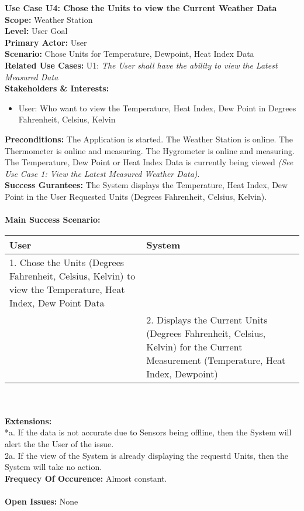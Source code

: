 \documentclass[letterpaper]{article}
\begin{document}
\noindent
\textbf{Use Case U4:  Chose the Units to view the Current Weather
Data}\\
\textbf{Scope:  }Weather Station\\
\textbf{Level:  }User Goal\\
\textbf{Primary Actor:  }User\\
\textbf{Scenario:  }Chose Units for Temperature, Dewpoint, Heat
Index Data\\
\textbf{Related Use Cases:  }U1: \textit{The User shall have the
ability to view the Latest Measured Data}\\
\textbf{Stakeholders \& Interests:  }
\begin{itemize}
\item User:  Who want to view the Temperature, Heat Index, Dew Point
in Degrees Fahrenheit, Celsius, Kelvin
\end{itemize}
\textbf{Preconditions:  }The Application is started. The Weather
Station is online. The Thermometer is online and measuring.
The Hygrometer is online and measuring. The Temperature, Dew Point
or Heat Index Data is currently being viewed
\textit{(See Use Case 1:  View the Latest Measured Weather Data)}.\\
\textbf{Success Gurantees:  }The System displays the Temperature,
Heat Index, Dew Point in the User Requested Units (Degrees
Fahrenheit, Celsius, Kelvin).
\\\\
\textbf{Main Success Scenario:  }\\
\begin{tabular}{|p{6cm}|p{6cm}|}\hline
\textbf{User} & \textbf{System}\\\hline
 1.  Chose the Units (Degrees Fahrenheit, Celsius, Kelvin) to view
 the Temperature, Heat Index, Dew Point Data& \\\hline
& 2.  Displays the Current Units (Degrees Fahrenheit, Celsius,
Kelvin) for the Current Measurement (Temperature, Heat Index,
Dewpoint)\\\hline
\end{tabular}\\\\
\textbf{Extensions:  }\\
*a.  If the data is not accurate due to Sensors being offline, then
the System will alert the the User of the issue.\\
2a.  If the view of the System is already displaying the requestd
Units, then the System will take no action.\\
\textbf{Frequecy Of Occurence: } Almost constant.\\\\
\textbf{Open Issues: } None
\end{document}
